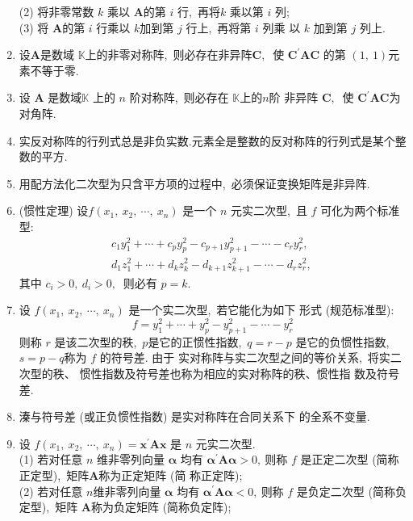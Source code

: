 \begin{enumerate}
		(2) 将非零常数 $ k $ 乘以 $ \boldsymbol{A}  $的第  $i $ 行,\  再将$  k $ 乘以第 $ i $ 列;\\
		(3) 将 $ \boldsymbol{A}  $的第  $i$  行乘以 $ k  $加到第 $ j $ 行上,\  再将第  $i$  列乘 以  $k$  加到第  $j $ 列上.
		\item 设$  \boldsymbol{A} $是数域  $\mathbb{K}  $上的非零对称阵,\  则必存在非异阵$  \boldsymbol{C} ,\ $ 使  $\boldsymbol{C}^{\prime} \boldsymbol{A} \boldsymbol{C} $ 的第  $(1,\ 1)  $元素不等于零.
		\item 设 $ \boldsymbol{A} $ 是数域$  \mathbb{K} $ 上的 $ n$  阶对称阵,\  则必存在  $\mathbb{K}  $上的$  n  $阶 非异阵  $\boldsymbol{C} ,\ $ 使 $ \boldsymbol{C}^{\prime} \boldsymbol{A} \boldsymbol{C}  $为对角阵.
		\item 实反对称阵的行列式总是非负实数.元素全是整数的反对称阵的行列式是某个整数的平方.
		\item 用配方法化二次型为只含平方项的过程中,\  必须保证变换矩阵是非异阵.
		\item (惯性定理) 设$  f\left(x_{1},\  x_{2},\  \cdots,\  x_{n}\right) $ 是一个  $n $ 元实二次型,\  且 $ f $ 可化为两个标准型:
		$$\begin{array}{l}
			c_{1} y_{1}^{2}+\cdots+c_{p} y_{p}^{2}-c_{p+1} y_{p+1}^{2}-\cdots-c_{r} y_{r}^{2},\  \\
			d_{1} z_{1}^{2}+\cdots+d_{k} z_{k}^{2}-d_{k+1} z_{k+1}^{2}-\cdots-d_{r} z_{r}^{2},\ 
		\end{array}$$
		其中  $c_{i}>0,\  d_{i}>0 ,\ $ 则必有  $p=k .$
		\item 设 $ f\left(x_{1},\  x_{2},\  \cdots,\  x_{n}\right) $ 是一个实二次型,\  若它能化为如下 形式 (规范标准型):
		$$f=y_{1}^{2}+\cdots+y_{p}^{2}-y_{p+1}^{2}-\cdots-y_{r}^{2}$$
		则称 $ r $ 是该二次型的秩,\   $p  $是它的正惯性指数,\  $ q=r-p $ 是它的负惯性指数,\ $  s=p-q  $称为 $ f $ 的符号差. 由于 实对称阵与实二次型之间的等价关系,\  将实二次型的秩、 惯性指数及符号差也称为相应的实对称阵的秩、惯性指 数及符号差.
		\item 溱与符号差 (或正负惯性指数) 是实对称阵在合同关系下 的全系不变量.
		\item 设  $f\left(x_{1},\  x_{2},\  \cdots,\  x_{n}\right)=\boldsymbol{x}^{\prime} \boldsymbol{A} \boldsymbol{x} $ 是  $n $ 元实二次型.\\
		(1) 若对任意 $ n $ 维非零列向量  $\boldsymbol{\alpha} $ 均有 $ \boldsymbol{\alpha}^{\prime} \boldsymbol{A \alpha}>0 ,\  $则称  $f $ 是正定二次型 (简称正定型),\  矩阵$  \boldsymbol{A}  $称为正定矩阵 (简 称正定阵);\\
		(2) 若对任意  $n  $维非零列向量 $ \boldsymbol{\alpha} $ 均有 $ \boldsymbol{\alpha}^{\prime} \boldsymbol{A}\boldsymbol{\alpha}<0 ,\  $则称 $ f $ 是负定二次型 (简称负定型),\  矩阵  $\boldsymbol{A}  $称为负定矩阵 (简称负定阵);\\

\end{enumerate}
